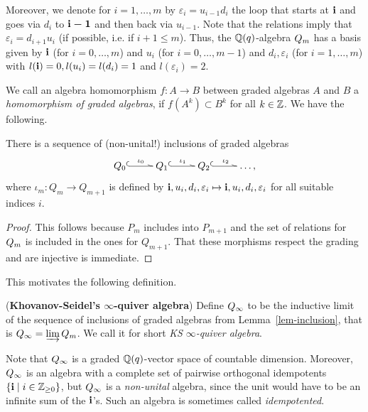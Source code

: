 Moreover, we denote for $i=1,\dots,m$ by $\varepsilon_i=u_{i-1}d_i$ 
the loop that starts at $\boldsymbol{\mathrm{i}}$ and goes via $d_i$ to $\boldsymbol{\mathrm{i}-1}$ 
and then back via $u_{i-1}$. Note that the relations imply 
that $\varepsilon_i=d_{i+1}u_i$ (if possible, i.e. if $i+1\leq m$). 
Thus, the $\mathbb{Q}(q)$-algebra $Q_{m}$ has a basis given by $\boldsymbol{\mathrm{i}}$ 
(for $i=0,\dots,m$) and $u_i$ (for $i=0,\dots,m-1$) and 
$d_i, \varepsilon_i$ (for $i=1,\dots,m$) with $l(\boldsymbol{\mathrm{i}})=0,l(u_i)=l(d_i)=1$ and $l(\varepsilon_i)=2$.


We call an algebra homomorphism $f\colon A\to B$ between 
graded algebras $A$ and $B$ a 
\textit{homomorphism of graded algebras}, if $f(A^k)\subset B^k$ for all $k\in\mathbb{Z}$.
We have the following.

\begin{lem}\label{lem-inclusion}
There is a sequence of (non-unital!) inclusions of graded algebras
\[
\xymatrix{
  Q_0 \ar@^{(->}[r]^{\iota_0} &  Q_1  \ar@^{(->}[r]^{\iota_1}  & Q_2  \ar@^{(->}[r]^{\iota_2} & \dots,
}
\]
where $\iota_m\colon Q_m\to Q_{m+1}$ is defined by $\boldsymbol{\mathrm{i}},u_i,d_i,\varepsilon_i\mapsto \boldsymbol{\mathrm{i}},u_i,d_i,\varepsilon_i$ for all suitable indices $i$.\makeqed
\end{lem}



\begin{proof}
This follows because $P_m$ includes 
into $P_{m+1}$ and the set of relations for 
$Q_{m}$ is included in the ones for $Q_{m+1}$. 
That these morphisms respect the grading and are injective is immediate.
\end{proof}




This motivates the following definition.
\begin{defn}\label{def-ksquiver2}(\textbf{Khovanov-Seidel's $\infty$-quiver algebra})
Define $Q_{\infty}$ to be the inductive limit 
of the sequence of inclusions of graded 
algebras from Lemma~\ref{lem-inclusion}, that is $Q_{\infty}=\varinjlim Q_{m}$. 
We call it for short 
\textit{KS} $\infty$\textit{-quiver algebra}.
\end{defn}



Note that $Q_{\infty}$ is a graded $\mathbb{Q}(q)$-vector 
space of countable dimension. Moreover, 
$Q_{\infty}$ is an algebra with a 
complete set of pairwise orthogonal 
idempotents $\{\boldsymbol{\mathrm{i}}\mid i\in\mathbb{Z}_{\geq 0}\}$, 
but $Q_{\infty}$ is a \textit{non-unital} algebra, 
since the unit would have to be an infinite sum of the $\boldsymbol{\mathrm{i}}$'s. Such 
an algebra is sometimes called \textit{idempotented}.


